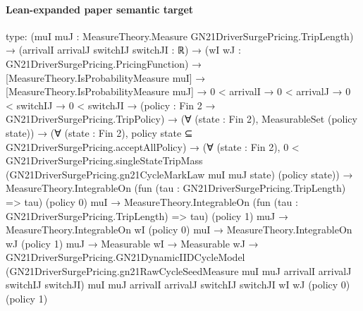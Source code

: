 \documentclass[10pt]{article}
\begin{document}
\paragraph{Lean-expanded paper semantic target}
\begin{ReviewVerbatim}
type:
(muI muJ : MeasureTheory.Measure GN21DriverSurgePricing.TripLength) →
  (arrivalI arrivalJ switchIJ switchJI : ℝ) →
    (wI wJ : GN21DriverSurgePricing.PricingFunction) →
      [MeasureTheory.IsProbabilityMeasure muI] →
        [MeasureTheory.IsProbabilityMeasure muJ] →
          0 < arrivalI →
            0 < arrivalJ →
              0 < switchIJ →
                0 < switchJI →
                  (policy : Fin 2 → GN21DriverSurgePricing.TripPolicy) →
                    (∀ (state : Fin 2), MeasurableSet (policy state)) →
                      (∀ (state : Fin 2), policy state ⊆ GN21DriverSurgePricing.acceptAllPolicy) →
                        (∀ (state : Fin 2),
                            0 <
                              GN21DriverSurgePricing.singleStateTripMass
                                (GN21DriverSurgePricing.gn21CycleMarkLaw muI muJ state) (policy state)) →
                          MeasureTheory.IntegrableOn (fun (tau : GN21DriverSurgePricing.TripLength) => tau) (policy 0)
                              muI →
                            MeasureTheory.IntegrableOn (fun (tau : GN21DriverSurgePricing.TripLength) => tau) (policy 1)
                                muJ →
                              MeasureTheory.IntegrableOn wI (policy 0) muI →
                                MeasureTheory.IntegrableOn wJ (policy 1) muJ →
                                  Measurable wI →
                                    Measurable wJ →
                                      GN21DriverSurgePricing.GN21DynamicIIDCycleModel
                                        (GN21DriverSurgePricing.gn21RawCycleSeedMeasure muI muJ arrivalI arrivalJ
                                          switchIJ switchJI)
                                        muI muJ arrivalI arrivalJ switchIJ switchJI wI wJ (policy 0) (policy 1)


\end{ReviewVerbatim}
\end{document}
